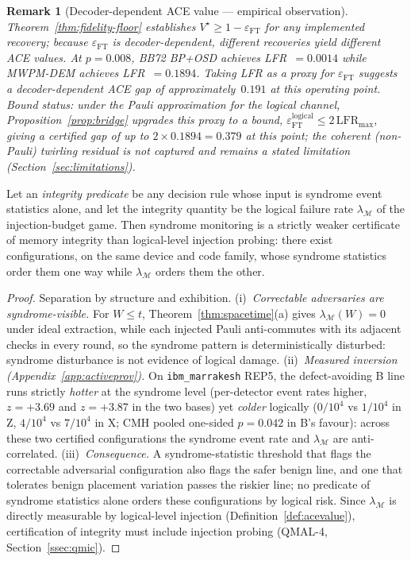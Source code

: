 \documentclass[11pt,a4paper]{article}
\newtheorem{remark}{Remark}
\begin{document}
\begin{remark}[Decoder-dependent ACE value --- empirical observation]
\label{rem:decoder-gap}
Theorem~\ref{thm:fidelity-floor} establishes $V^\star\ge1-\varepsilon_{\mathrm{FT}}$
for any implemented recovery; because $\varepsilon_{\mathrm{FT}}$ is
decoder-dependent, different recoveries yield different ACE values.
At $p=0.008$, BB72 BP+OSD achieves LFR~$=0.0014$ while MWPM-DEM achieves
LFR~$=0.1894$.
Taking LFR as a proxy for $\varepsilon_{\mathrm{FT}}$ suggests a
decoder-dependent ACE gap of approximately~$0.191$ at this operating point.
\emph{Bound status:} under the Pauli approximation for the logical
channel, Proposition~\ref{prop:bridge} upgrades this proxy to a bound,
$\varepsilon_{\mathrm{FT}}^{\mathrm{logical}}\le2\,\mathrm{LFR}_{\max}$,
giving a certified gap of up to $2\times0.1894=0.379$ at this point;
the coherent (non-Pauli) twirling residual is not captured and remains
a stated limitation (Section~\ref{sec:limitations}).
\end{remark}

\begin{proposition}\label{prop:syndrome-insufficient}
Let an \emph{integrity predicate} be any decision rule whose input is
syndrome event statistics alone, and let the integrity quantity be the
logical failure rate $\lambda_{\mathcal{M}}$ of the injection-budget
game. Then syndrome monitoring is a strictly weaker certificate of
memory integrity than logical-level injection probing: there exist
configurations, on the same device and code family, whose syndrome
statistics order them one way while $\lambda_{\mathcal{M}}$ orders
them the other.
\end{proposition}
\begin{proof}
Separation by structure and exhibition.
(i)~\emph{Correctable adversaries are syndrome-visible.}
For $W\le t$, Theorem~\ref{thm:spacetime}(a) gives
$\lambda_{\mathcal{M}}(W)=0$ under ideal extraction, while each
injected Pauli anti-commutes with its adjacent checks in every round,
so the syndrome pattern is deterministically disturbed: syndrome
disturbance is not evidence of logical damage.
(ii)~\emph{Measured inversion (Appendix~\ref{app:activeprov}).}
On \texttt{ibm\_marrakesh} REP5, the defect-avoiding B line runs
strictly \emph{hotter} at the syndrome level (per-detector event rates
higher, $z=+3.69$ and $z=+3.87$ in the two bases) yet \emph{colder}
logically ($0/10^4$ vs $1/10^4$ in Z, $4/10^4$ vs $7/10^4$ in X; CMH
pooled one-sided $p=0.042$ in B's favour): across these two certified
configurations the syndrome event rate and $\lambda_{\mathcal{M}}$
are anti-correlated.
(iii)~\emph{Consequence.} A syndrome-statistic threshold that flags
the correctable adversarial configuration also flags the safer benign
line, and one that tolerates benign placement variation passes the
riskier line; no predicate of syndrome statistics alone orders these
configurations by logical risk. Since $\lambda_{\mathcal{M}}$ is
directly measurable by logical-level injection
(Definition~\ref{def:acevalue}), certification of integrity must include
injection probing (QMAL-4, Section~\ref{ssec:qmic}).
\end{proof}
\end{document}
